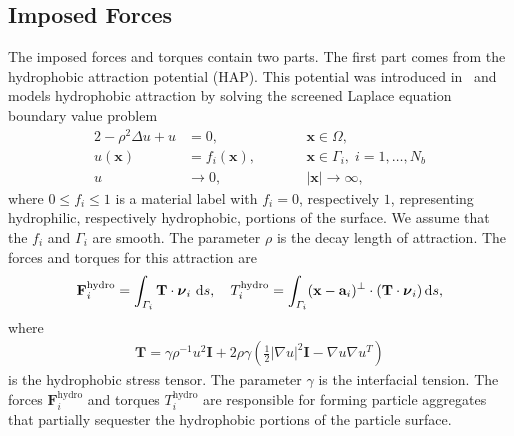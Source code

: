 \documentclass[lineno]{jfm}
\renewcommand{\aa}{\mathbf{a}}
\newcommand{\FF}{\mathbf{F}}
\newcommand{\nnu}{\boldsymbol{\nu}}
\newcommand{\xx}{\mathbf{x}}
\begin{document}
\subsection{Imposed Forces}
The imposed forces and torques contain two parts. The first part comes
from the hydrophobic attraction potential (HAP). This potential was
introduced in~\cite{Fu20} and models hydrophobic attraction by solving
the screened Laplace equation boundary value problem
\begin{alignat}{2}
  \label{eq:SL}
-\rho^2 \Delta u + u &=0,            && \xx \in \Omega,\\
\label{eq:SLbc}
u(\xx) &= f_i(\xx),\qquad  && \xx \in \Gamma_i,\; i=1,\ldots,N_b \\
\label{eq:SLff}
u &\to 0,                          &&|\xx| \to \infty,
\end{alignat}
where $0 \leq f_i \leq 1$ is a material label with $f_i = 0$,
respectively $1$, representing hydrophilic, respectively hydrophobic,
portions of the surface. We assume that the $f_i$ and $\Gamma_i$ are
smooth. The parameter $\rho$ is the decay length of attraction. The
forces and torques for this attraction are 
\begin{align}
  \label{eq:hydrophobicAttraction}
  \FF_i^{\text{hydro}} = \int_{\Gamma_i} {\bf T}\cdot \nnu_i \, \dif s, 
    \quad 
  T_i^{\text{hydro}} = \int_{\Gamma_i} (\xx - \aa_i)^{\perp} \cdot ({\bf T} \cdot \nnu_i) \dif s,
\end{align}
where
\begin{align}
  \label{eq:stress}
\mathbf{T}
= \gamma\rho^{-1}u^2 \mathbf{I} + 2\rho\gamma \left(\tfrac{1}{2}|\nabla
  u|^2 \mathbf{I} - \nabla u  \nabla u^T\right)
\end{align}
is the hydrophobic stress tensor. The parameter $\gamma$ is
the interfacial
tension. The forces $\FF_i^{\text{hydro}}$ and torques
$T_i^{\text{hydro}}$ are responsible for forming particle aggregates
that partially sequester the hydrophobic portions of the particle
surface.
\end{document}
